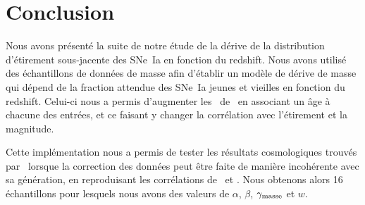 \documentclass[../main/main.tex]{subfiles}
\begin{document}
\restoregeometry

\section{Conclusion}\label{sec:simccl}

Nous avons présenté la suite de notre étude de la dérive de la distribution
d'étirement sous-jacente des SNe~Ia en fonction du redshift. Nous avons utilisé
des échantillons de données de masse afin d'établir un modèle de dérive de masse
qui dépend de la fraction attendue des SNe~Ia jeunes et vieilles en fonction du
redshift. Celui-ci nous a permis d'augmenter les \hostlib\
de~ en associant un âge à chacune des entrées, et ce
faisant y changer la corrélation avec l'étirement et la magnitude.

Cette implémentation nous a permis de tester les résultats cosmologiques trouvés
par \snana\ lorsque la correction des données peut être faite de manière
incohérente avec sa génération, en reproduisant les corrélations
de~\citetalias{scolnic2016} et \citetalias{popovic2021a}. Nous obtenons alors 16
échantillons pour lesquels nous avons des valeurs de $\alpha$, $\beta$,
$\gamma_{\rm masse}$ et $w$.
\end{document}

